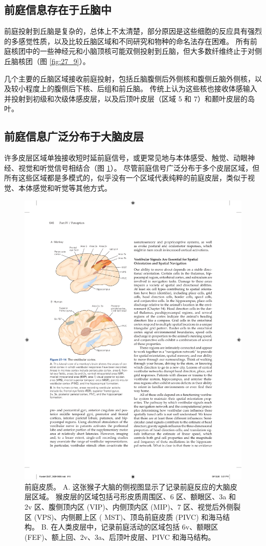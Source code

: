 \subsection{前庭信息存在于丘脑中}

前庭投射到丘脑是复杂的，总体上不太清楚，部分原因是这些细胞的反应具有强烈的多感觉性质，以及比较丘脑区域和不同研究和物种的命名法存在困难。
所有前庭核团中的一些神经元和小脑顶核可能双侧投射到丘脑，但大多数纤维终止于对侧丘脑核团（图 \ref{fig:27_9}）。


几个主要的丘脑区域接收前庭投射，包括丘脑腹侧后外侧核和腹侧丘脑外侧核，以及较小程度上的腹侧后下核、后组和前丘脑。
传统上认为这些核也接收体感输入并投射到初级和次级体感皮层，以及后顶叶皮层（区域 5 和 7）和颞叶皮层的岛叶。


\subsection{前庭信息广泛分布于大脑皮层}

许多皮层区域单独接收短时延前庭信号，或更常见地与本体感受、触觉、动眼神经、视觉和听觉信号相结合（图 \ref{fig:27_14}）。 
尽管前庭信号广泛分布于多个皮层区域，但所有这些区域都是多模式的，似乎没有一个区域代表纯粹的前庭皮层，类似于视觉、本体感觉和听觉等其他方式。


\begin{figure}[htbp]
	\centering
	\includegraphics[width=0.5\linewidth]{chap27/fig_27_14}
	\caption{前庭皮质。 A. 这张猴子大脑的侧视图显示了记录前庭反应的大脑皮层区域。 猴皮层的区域包括弓形皮质周围区、6 区、额眼区、3a 和 2v 区、腹侧顶内区 (VIP)、内侧顶内区 (MIP)、7 区、视觉后外侧裂区 (VPS)、内侧颞上区 ( MST)、顶岛前庭皮质 (PIVC) 和海马结构。 B. 在人类皮层中，记录前庭活动的区域包括 6v、额眼区 (FEF)、额上回、2v、3a、后顶叶皮层、PIVC 和海马结构。}
	\label{fig:27_14}
\end{figure}


